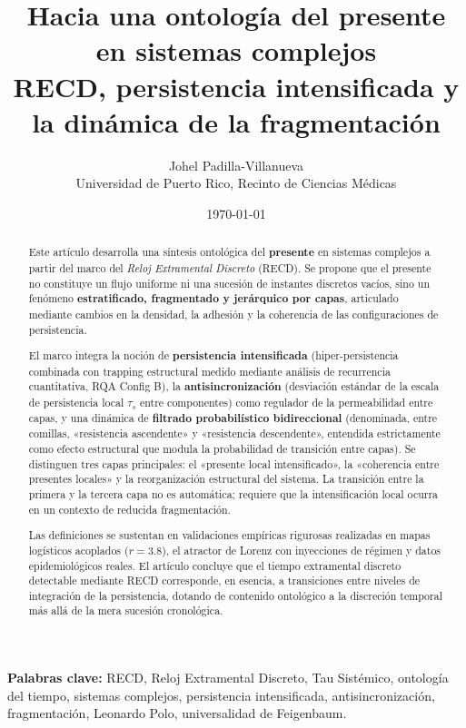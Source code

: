 \documentclass[11pt,a4paper]{article}
\title{\textbf{Hacia una ontología del presente en sistemas complejos}\\[0.3em]
\large RECD, persistencia intensificada y la dinámica de la fragmentación}
\author{Johel Padilla-Villanueva\\
\small Universidad de Puerto Rico, Recinto de Ciencias Médicas}
\date{\today}
\begin{document}
\maketitle

\begin{abstract}
Este artículo desarrolla una síntesis ontológica del \textbf{presente} en sistemas complejos a partir del marco del \textit{Reloj Extramental Discreto} (RECD). Se propone que el presente no constituye un flujo uniforme ni una sucesión de instantes discretos vacíos, sino un fenómeno \textbf{estratificado, fragmentado y jerárquico por capas}, articulado mediante cambios en la densidad, la adhesión y la coherencia de las configuraciones de persistencia.

El marco integra la noción de \textbf{persistencia intensificada} (hiper-persistencia combinada con trapping estructural medido mediante análisis de recurrencia cuantitativa, RQA Config B), la \textbf{antisincronización} (desviación estándar de la escala de persistencia local $\tau_s$ entre componentes) como regulador de la permeabilidad entre capas, y una dinámica de \textbf{filtrado probabilístico bidireccional} (denominada, entre comillas, «resistencia ascendente» y «resistencia descendente», entendida estrictamente como efecto estructural que modula la probabilidad de transición entre capas). Se distinguen tres capas principales: el «presente local intensificado», la «coherencia entre presentes locales» y la reorganización estructural del sistema. La transición entre la primera y la tercera capa no es automática; requiere que la intensificación local ocurra en un contexto de reducida fragmentación.

Las definiciones se sustentan en validaciones empíricas rigurosas realizadas en mapas logísticos acoplados ($r=3.8$), el atractor de Lorenz con inyecciones de régimen y datos epidemiológicos reales. El artículo concluye que el tiempo extramental discreto detectable mediante RECD corresponde, en esencia, a transiciones entre niveles de integración de la persistencia, dotando de contenido ontológico a la discreción temporal más allá de la mera sucesión cronológica.
\end{abstract}

\noindent\textbf{Palabras clave:} RECD, Reloj Extramental Discreto, Tau Sistémico, ontología del tiempo, sistemas complejos, persistencia intensificada, antisincronización, fragmentación, Leonardo Polo, universalidad de Feigenbaum.

\newpage
\tableofcontents
\newpage
\end{document}
